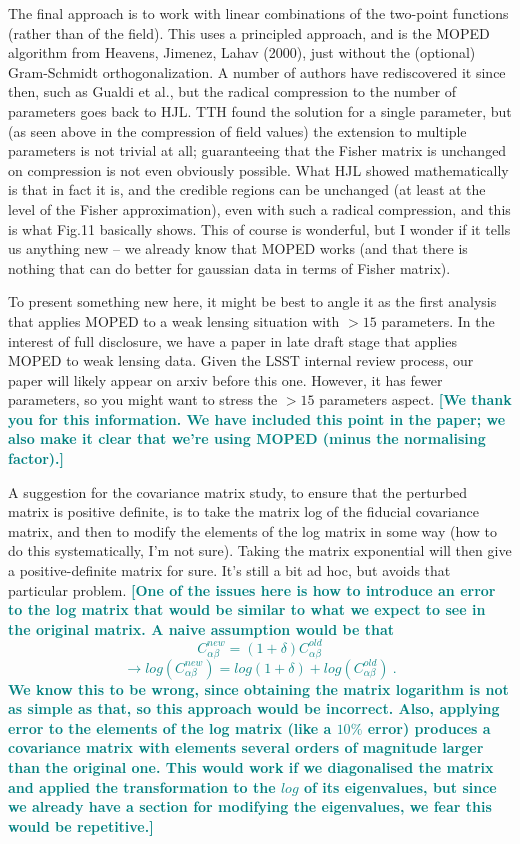 \documentclass{article}
\newcommand\reply[1]{{\bf {\textcolor{teal}{[#1]}}}}
\begin{document}
	The final approach is to work with linear combinations of the two-point functions (rather than of the field).  This uses a principled approach, and is the MOPED algorithm from Heavens, Jimenez, Lahav (2000), just without the (optional) Gram-Schmidt orthogonalization.  A number of authors have rediscovered it since then, such as Gualdi et al., but the radical compression to the number of parameters goes back to HJL.  TTH found the solution for a single parameter, but (as seen above in the compression of field values) the extension to multiple parameters is not trivial at all; guaranteeing that the Fisher matrix is unchanged on compression is not even obviously possible.  What HJL showed mathematically is that in fact it is, and the credible regions can be unchanged (at least at the level of the Fisher approximation), even with such a radical compression, and this is what Fig.11 basically shows.  This of course is wonderful, but I wonder if it tells us anything new – we already know that MOPED works (and that there is nothing that can do better for gaussian data in terms of Fisher matrix).
	
	To present something new here, it might be best to angle it as the first analysis that applies MOPED to a weak lensing situation with $>15$ parameters.   In the interest of full disclosure, we have a paper in late draft stage that applies MOPED to weak lensing data.  Given the LSST internal review process, our paper will likely appear on arxiv before this one.  However, it has fewer parameters, so you might want to stress the $>15$ parameters aspect.
	\reply{We thank you for this information. We have included this point in the paper; we also make it clear that we're using MOPED (minus the normalising factor).}
	
	A suggestion for the covariance matrix study, to ensure that the perturbed matrix is positive definite, is to take the matrix log of the fiducial covariance matrix, and then to modify the elements of the log matrix in some way (how to do this systematically, I’m not sure).  Taking the matrix exponential will then give a positive-definite matrix for sure. It’s still a bit ad hoc, but avoids that particular problem. 
	\reply{One of the issues here is how to introduce an error to the log matrix that would be similar to what we expect to see in the original matrix. A naive assumption would be that 
		$$C^{new}_{\alpha \beta} = (1 + \delta)C^{old}_{\alpha \beta}$$
		$$\rightarrow log \left( C^{new}_{\alpha \beta}\right) = log(1 + \delta) + log \left( C^{old}_{\alpha \beta} \right)\ .$$ We know this to be wrong, since obtaining the matrix logarithm is not as simple as that, so this approach would be incorrect. Also, applying error to the elements of the log matrix (like a $10\%$ error) produces a covariance matrix with elements several orders of magnitude larger than the original one. This would work if we diagonalised the matrix and applied the transformation to the $log$ of its eigenvalues, but since we already have a section for modifying the eigenvalues, we fear this would be repetitive.}\\
	
\end{document}
